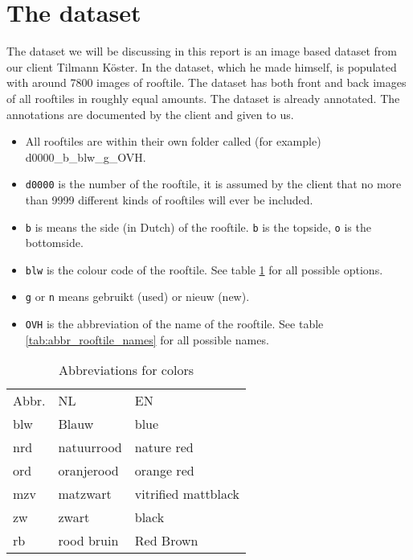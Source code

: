 \section{The dataset}
\begin{fullwidth}
	The dataset we will be discussing in this report is an image based dataset from our client Tilmann Köster. 
	In the dataset, which he made himself, is populated with around 7800 images of rooftile. 
	The dataset has both front and back images of all rooftiles in roughly equal amounts. 
	The dataset is already annotated. The annotations are documented by the client and given to us. 

	\begin{itemize}
		\item All rooftiles are within their own folder called (for example) d0000\_b\_blw\_g\_OVH.
		\item \verb|d0000| is the number of the rooftile, it is assumed by the client that no more than 9999 different kinds of rooftiles will ever be included.
		\item \verb|b| is means the side (in Dutch) of the rooftile. \verb|b| is the topside, \verb|o| is the bottomside.
		\item \verb|blw| is the colour code of the rooftile. See table \ref{tab:abbr_colours} for all possible options.
		\item \verb|g| or \verb|n| means gebruikt (used) or nieuw (new).
		\item \verb|OVH| is the abbreviation of the name of the rooftile. See table \ref{tab:abbr_rooftile_names} for all possible names.
	\end{itemize}
\end{fullwidth}

\begin{table}[H]
    \begin{tabular}{lll}
        Abbr.        & NL         & EN                  \\
        blw          & Blauw      & blue                \\
        nrd          & natuurrood & nature red          \\
        ord          & oranjerood & orange red          \\
        mzv          & matzwart   & vitrified mattblack \\
        zw           & zwart      & black               \\
        rb           & rood bruin & Red Brown          
    \end{tabular}
    \caption{Abbreviations for colors}
    \label{tab:abbr_colours}
\end{table}

